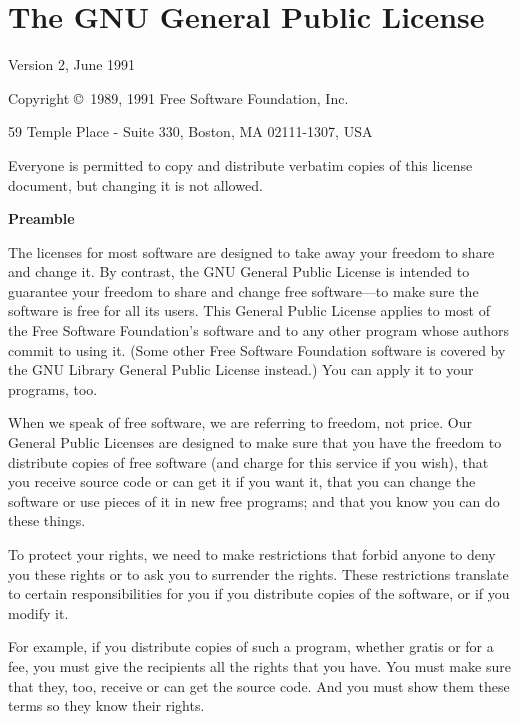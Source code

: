 \documentclass{article}
\begin{document}
\newpage

\section{The GNU General Public License}

\begin{center}
{\parindent 0in

Version 2, June 1991

Copyright \copyright\ 1989, 1991 Free Software Foundation, Inc.

\bigskip

59 Temple Place - Suite 330, Boston, MA  02111-1307, USA

\bigskip

Everyone is permitted to copy and distribute verbatim copies
of this license document, but changing it is not allowed.
}
\end{center}

\begin{center}
{\bf\large Preamble}
\end{center}


The licenses for most software are designed to take away your freedom to
share and change it.  By contrast, the GNU General Public License is
intended to guarantee your freedom to share and change free software---to
make sure the software is free for all its users.  This General Public
License applies to most of the Free Software Foundation's software and to
any other program whose authors commit to using it.  (Some other Free
Software Foundation software is covered by the GNU Library General Public
License instead.)  You can apply it to your programs, too.

When we speak of free software, we are referring to freedom, not price.
Our General Public Licenses are designed to make sure that you have the
freedom to distribute copies of free software (and charge for this service
if you wish), that you receive source code or can get it if you want it,
that you can change the software or use pieces of it in new free programs;
and that you know you can do these things.

To protect your rights, we need to make restrictions that forbid anyone to
deny you these rights or to ask you to surrender the rights.  These
restrictions translate to certain responsibilities for you if you
distribute copies of the software, or if you modify it.

For example, if you distribute copies of such a program, whether gratis or
for a fee, you must give the recipients all the rights that you have.  You
must make sure that they, too, receive or can get the source code.  And
you must show them these terms so they know their rights.
\end{document}
